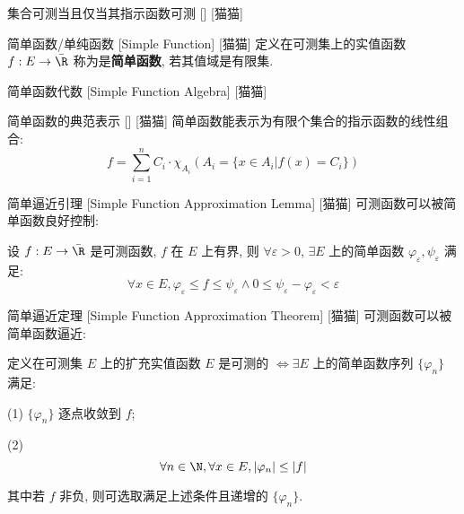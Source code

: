 \documentclass[UTF8]{ctexart}
\begin{document}
            \begin{ppt}
                {集合可测当且仅当其指示函数可测}
                []
                [猫猫]
            \end{ppt}
            
            \begin{dfn}
                {简单函数/单纯函数}
                [Simple Function]
                [猫猫]
                定义在可测集上的实值函数 \(f:E\to\bar{\R}\) 称为是\textbf{简单函数}, 若其值域是有限集. 
            \end{dfn}
            
            \begin{ppt}
                {简单函数代数}
                [Simple Function Algebra]
                [猫猫]
            \end{ppt}
            
            \begin{ppt}
                {简单函数的典范表示}
                []
                [猫猫]
                简单函数能表示为有限个集合的指示函数的线性组合: 
                \[f=\sum_{i=1}^{n}C_i\cdot\chi_{A_i}(A_i=\{x\in A_i|f(x)=C_i\})\]
            \end{ppt}
            
            \begin{lma}
                {简单逼近引理}
                [Simple Function Approximation Lemma]
                [猫猫]
                可测函数可以被简单函数良好控制: 

                设 \(f:E\to\bar{\R}\) 是可测函数, \(f\) 在 \(E\) 上有界, 则 \(\forall\varepsilon>0\), \(\exists E\) 上的简单函数 \(\varphi_\varepsilon, \psi_\varepsilon\) 满足: 
                \[\forall x\in E, \varphi_\varepsilon\leq f\leq\psi_\varepsilon\wedge 0\leq\psi_\varepsilon-\varphi_\varepsilon<\varepsilon\]
            \end{lma}
            
            \begin{thm}
                {简单逼近定理}
                [Simple Function Approximation Theorem]
                [猫猫]
                可测函数可以被简单函数逼近: 

                定义在可测集 \(E\) 上的扩充实值函数 \(E\) 是可测的 \(\iff\exists E\) 上的简单函数序列 \(\{\varphi_n\}\) 满足: 
                
                (1) \(\{\varphi_n\}\) 逐点收敛到 \(f\); 

                (2) \[\forall n\in\N, \forall x\in E, |\varphi_n|\leq|f|\]

                其中若 \(f\) 非负, 则可选取满足上述条件且递增的 \(\{\varphi_n\}\). 
            \end{thm}
\end{document}
